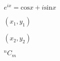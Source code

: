 \documentclass{article}
\begin{document}
$ e^{i x} = \mathrm{cos} x + i \mathrm{sin} x  $
\pagebreak

$(x_1,y_1)$
\pagebreak

$(x_2,y_2)$
\pagebreak

$^nC_m $
\pagebreak
\end{document}
